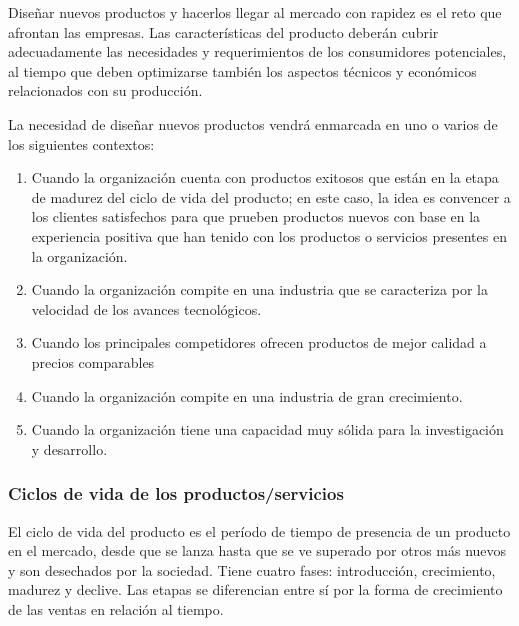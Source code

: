\documentclass[10pt,a4paper,spanish]{report}
\begin{document}
                  Diseñar nuevos productos y hacerlos llegar al mercado con rapidez es el reto que afrontan las empresas. Las características del producto deberán cubrir adecuadamente las necesidades y requerimientos de los consumidores potenciales, al tiempo que deben optimizarse también los aspectos técnicos y económicos relacionados con su producción.

                  La necesidad de diseñar nuevos productos vendrá enmarcada en uno o varios de los siguientes contextos:
                  \begin{enumerate}[1.]
                        \item Cuando la organización cuenta con productos exitosos que están en la etapa de madurez del ciclo de vida del producto; en este caso, la idea es convencer a los clientes satisfechos para que prueben productos nuevos con base en la experiencia positiva que han tenido con los productos o servicios presentes en la organización.
                        \item Cuando la organización compite en una industria que se caracteriza por la velocidad de los avances tecnológicos.
                        \item Cuando los principales competidores ofrecen productos de mejor calidad a precios comparables
                        \item Cuando la organización compite en una industria de gran crecimiento.
                        \item Cuando la organización tiene una capacidad muy sólida para la investigación y desarrollo.
                  \end{enumerate}

                  \subsubsection{\textcolor[rgb]{0.9,0.7,0.6}Ciclos de vida de los productos/servicios}

                        El ciclo de vida del producto es el período de tiempo de presencia de un producto en el mercado, desde que se lanza hasta que se ve superado por otros más nuevos y son desechados por la sociedad. Tiene cuatro fases: introducción, crecimiento, madurez y declive. Las etapas se diferencian entre sí por la forma de crecimiento de las ventas en relación al tiempo.
\end{document}
